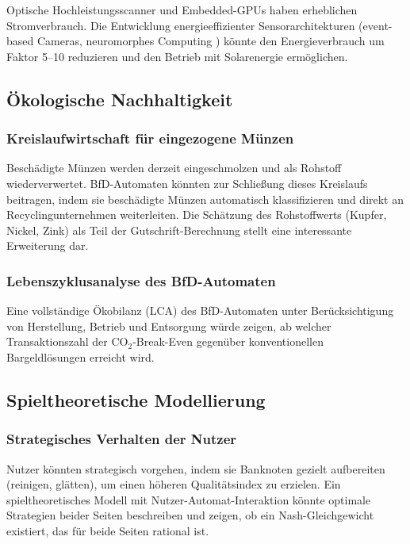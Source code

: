 ﻿\documentclass[a4paper,12pt]{article}
\theoremstyle{definition}
\begin{document}
Optische Hochleistungsscanner und Embedded-GPUs haben erheblichen Stromverbrauch.
Die Entwicklung energieeffizienter Sensorarchitekturen (event-based Cameras,
neuromorphes Computing \cite{mahowald1992vlsi}) könnte den Energieverbrauch
um Faktor 5--10 reduzieren und den Betrieb mit Solarenergie ermöglichen.

\subsection{Ökologische Nachhaltigkeit}

\subsubsection{Kreislaufwirtschaft für eingezogene Münzen}

Beschädigte Münzen werden derzeit eingeschmolzen und als Rohstoff
wiederverwertet.  BfD-Automaten könnten zur Schließung dieses Kreislaufs
beitragen, indem sie beschädigte Münzen automatisch klassifizieren
und direkt an Recyclingunternehmen weiterleiten.
Die Schätzung des Rohstoffwerts (Kupfer, Nickel, Zink) als Teil der
Gutschrift-Berechnung stellt eine interessante Erweiterung dar.

\subsubsection{Lebenszyklusanalyse des BfD-Automaten}

Eine vollständige Ökobilanz (LCA) des BfD-Automaten unter Berücksichtigung
von Herstellung, Betrieb und Entsorgung würde zeigen, ab welcher
Transaktionszahl der CO$_2$-Break-Even gegenüber konventionellen
Bargeldlösungen erreicht wird.

\subsection{Spieltheoretische Modellierung}

\subsubsection{Strategisches Verhalten der Nutzer}

Nutzer könnten strategisch vorgehen, indem sie Banknoten gezielt aufbereiten
(reinigen, glätten), um einen höheren Qualitätsindex zu erzielen.
Ein spieltheoretisches Modell \cite{fudenberg1991game} mit Nutzer-Automat-Interaktion
könnte optimale Strategien beider Seiten beschreiben und zeigen,
ob ein Nash-Gleichgewicht existiert, das für beide Seiten rational ist.
\end{document}
